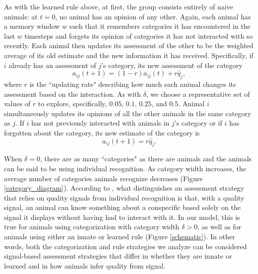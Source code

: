 As with the learned rule above, at first, the group consists entirely of naive animals: at $t=0$, no animal has an opinion of any other. Again, each animal has a memory window $w$ such that it remembers categories it has encountered in the last $w$ timesteps and forgets its opinion of categories it has not interacted with so recently. Each animal then updates its assessment of the other to be the weighted average of its old estimate and the new information it has received. Specifically, if $i$ already has an assessment of $j$'s category, its new assessment of the category
\begin{equation*}
a_{ij}(t+1)=(1-r)a_{ij}(t)+r\hat{q}_j,
\end{equation*}
where $r$ is the ``updating rate" describing how much each animal changes its assessment based on the interaction. As with $\delta$, we choose a representative set of values of $r$ to explore, specifically, $0.05$, $0.1$, $0.25$, and $0.5$. Animal $i$ simultaneously updates its opinions of all the other animals in the same category as $j$.
If $i$ has not previously interacted with animals in $j$'s category or if $i$ has forgotten about the category, its new estimate of the category is
\begin{equation*}
a_{ij}(t+1)=r\hat{q}_j.
\end{equation*}

When $\delta=0$, there are as many ``categories" as there are animals and the animals can be said to be using individual recognition. As category width increases, the average number of categories animals recognize decreases (Figure \ref{category_diagram}). According to \citet{sheehan2016evotradeoff}, what distinguishes an assessment strategy that relies on quality signals from individual recognition is that, with a quality signal, an animal can know something about a conspecific based solely on the signal it displays without having had to interact with it. In our model, this is true for animals using categorization with category width $\delta>0$, as well as for animals using either an innate or learned rule (Figure \ref{schematic}). In other words, both the categorization and rule strategies we analyze can be considered signal-based assessment strategies that differ in whether they are innate or learned and in how animals infer quality from signal. 
 
